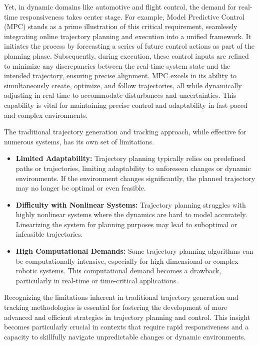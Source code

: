 Yet, in dynamic domains like automotive and flight control, the demand for real-time responsiveness takes center stage. For example, Model Predictive Control (MPC)\cite{kouvaritakis2016model} stands as a prime illustration of this critical requirement, seamlessly integrating online trajectory planning and execution into a unified framework. It initiates the process by forecasting a series of future control actions as part of the planning phase. Subsequently, during execution, these control inputs are refined to minimize any discrepancies between the real-time system state and the intended trajectory, ensuring precise alignment. MPC excels in its ability to simultaneously create, optimize, and follow trajectories, all while dynamically adjusting in real-time to accommodate disturbances and uncertainties. This capability is vital for maintaining precise control and adaptability in fast-paced and complex environments.

The traditional trajectory generation and tracking approach, while effective for numerous systems, has its own set of limitations.
\begin{itemize}
    \item \textbf{Limited Adaptability:}
    Trajectory planning typically relies on predefined paths or trajectories, limiting adaptability to unforeseen changes or dynamic environments. If the environment changes significantly, the planned trajectory may no longer be optimal or even feasible.
        
    \item \textbf{Difficulty with Nonlinear Systems:}
    Trajectory planning struggles with highly nonlinear systems where the dynamics are hard to model accurately. Linearizing the system for planning purposes may lead to suboptimal or infeasible trajectories.
    
    \item \textbf{High Computational Demands:}
    Some trajectory planning algorithms can be computationally intensive, especially for high-dimensional or complex robotic systems. This computational demand becomes a drawback, particularly in real-time or time-critical applications.
\end{itemize}

Recognizing the limitations inherent in traditional trajectory generation and tracking methodologies is essential for fostering the development of more advanced and efficient strategies in trajectory planning and control. This insight becomes particularly crucial in contexts that require rapid responsiveness and a capacity to skillfully navigate unpredictable changes or dynamic environments.

